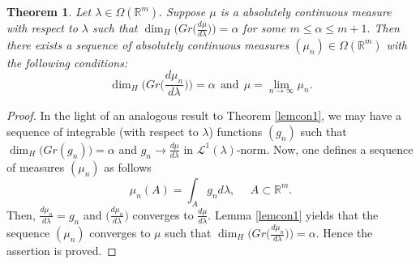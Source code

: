 \documentclass{amsproc}
\newtheorem{theorem}{Theorem}[section]
\theoremstyle{definition}
\theoremstyle{remark}
\numberwithin{equation}{section}
\begin{document}
\begin{theorem}\label{approxthm1}
Let  $\lambda \in \Omega( \mathbb{R}^m).$
Suppose $\mu$ is a absolutely continuous measure with respect to $\lambda$ such that $\dim_H \Big(Gr\big(\frac{d\mu}{d\lambda}\big)\Big) =\alpha$ for some $m \le \alpha \le m+1.$ Then there exists a sequence of absolutely continuous measures $(\mu_n) \in \Omega( \mathbb{R}^m)$ with the following conditions: $$\dim_H\Big(Gr\big(\frac{d\mu_n}{d\lambda}\big)\Big) =\alpha ~~\text{and}~~ \mu =\lim_{n \to \infty}\mu_n.$$  
\end{theorem}
\begin{proof}
In the light of an analogous result to Theorem \ref{lemcon1}, we may have a sequence of integrable (with respect to $\lambda$) functions $(g_n)$ such that $\dim_H\big(Gr(g_n)\big) =\alpha$ and  $g_n \to \frac{d\mu}{d\lambda}$ in $\mathcal{L}^1(\lambda)$-norm. 
Now, one defines a sequence of measures $(\mu_n)$ as follows $$\mu_n(A)=\int_A g_nd\lambda, ~~~~~~ A \subset \mathbb{R}^m.$$ Then, $\frac{d\mu_n}{d\lambda}=g_n$ and $\Big(\frac{d\mu_n}{d\lambda}\Big)$ converges to $\frac{d\mu}{d\lambda}.$ Lemma \ref{lemcon1} yields that the sequence $(\mu_n)$ converges to $\mu$ such that $\dim_H\Big(Gr\big(\frac{d\mu_n}{d\lambda}\big)\Big) =\alpha.$ Hence the assertion is proved. 
\end{proof}



\end{document}
